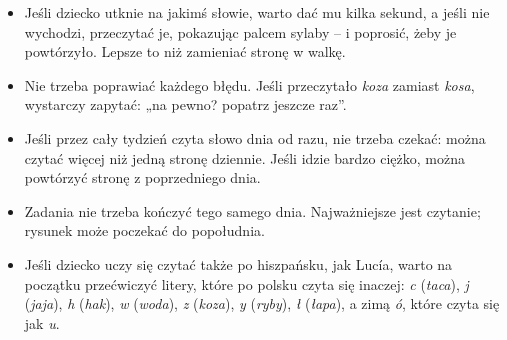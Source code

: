 {\small
\begin{itemize}[leftmargin=6mm, itemsep=1pt, topsep=2pt]
\item Jeśli dziecko utknie na jakimś słowie, warto dać mu kilka sekund,
  a jeśli nie wychodzi, przeczytać je, pokazując palcem sylaby -- i
  poprosić, żeby je powtórzyło. Lepsze to niż zamieniać stronę w walkę.
\item Nie trzeba poprawiać każdego błędu. Jeśli przeczytało \emph{koza}
  zamiast \emph{kosa}, wystarczy zapytać: „na pewno? popatrz jeszcze
  raz”.
\item Jeśli przez cały tydzień czyta słowo dnia od razu, nie trzeba
  czekać: można czytać więcej niż jedną stronę dziennie. Jeśli idzie
  bardzo ciężko, można powtórzyć stronę z poprzedniego dnia.
\item Zadania nie trzeba kończyć tego samego dnia. Najważniejsze jest
  czytanie; rysunek może poczekać do popołudnia.
\item Jeśli dziecko uczy się czytać także po hiszpańsku, jak Lucía,
  warto na początku przećwiczyć litery, które po polsku czyta się
  inaczej: \emph{c} (\emph{taca}), \emph{j} (\emph{jaja}), \emph{h}
  (\emph{hak}), \emph{w} (\emph{woda}), \emph{z} (\emph{koza}),
  \emph{y} (\emph{ryby}), \emph{ł} (\emph{łapa}), a zimą \emph{ó}, które
  czyta się jak \emph{u}.
\end{itemize}}
\newpage
